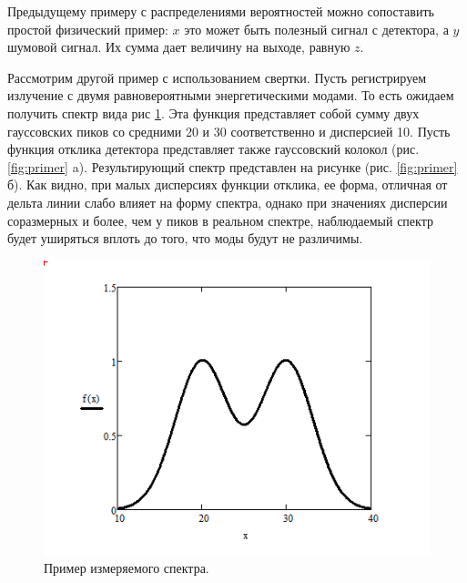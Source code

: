 Предыдущему примеру с распределениями вероятностей можно сопоставить простой физический пример: $x$ это может быть полезный сигнал с детектора, а $y$ шумовой сигнал. Их сумма дает величину на выходе, равную $z$.

Рассмотрим другой пример с использованием свертки. Пусть регистрируем излучение с двумя равновероятными энергетическими модами. То есть ожидаем получить спектр вида рис \ref{fig:f(x)}. Эта функция представляет собой сумму двух гауссовских пиков со средними 20 и 30 соответственно и дисперсией 10. Пусть функция отклика детектора представляет также гауссовский колокол (рис. \ref{fig:primer} a). Результирующий спектр представлен на рисунке (рис. \ref{fig:primer} б). Как видно, при малых дисперсиях функции отклика, ее форма, отличная от дельта линии слабо влияет на форму спектра, однако при значениях дисперсии соразмерных и более, чем у пиков в реальном спектре, наблюдаемый спектр будет уширяться вплоть до того, что моды будут не различимы.
\begin{figure}
    \centering
    \includegraphics{Pictures/f(x).png}
    \caption{Пример измеряемого спектра.}
    \label{fig:f(x)}
\end{figure}
